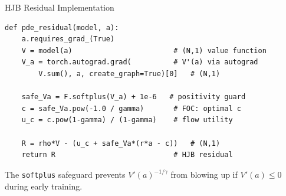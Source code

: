 \documentclass[aspectratio=169,11pt]{beamer}
\begin{document}
\begin{frame}[fragile]{HJB Residual Implementation}
\begin{lstlisting}[basicstyle=\footnotesize\ttfamily]
def pde_residual(model, a):
    a.requires_grad_(True)
    V = model(a)                        # (N,1) value function
    V_a = torch.autograd.grad(          # V'(a) via autograd
        V.sum(), a, create_graph=True)[0]   # (N,1)

    safe_Va = F.softplus(V_a) + 1e-6   # positivity guard
    c = safe_Va.pow(-1.0 / gamma)       # FOC: optimal c
    u_c = c.pow(1-gamma) / (1-gamma)    # flow utility

    R = rho*V - (u_c + safe_Va*(r*a - c))   # (N,1)
    return R                            # HJB residual
\end{lstlisting}

\vspace{0.1em}
{\footnotesize The \texttt{softplus} safeguard prevents $V'(a)^{-1/\gamma}$ from blowing up if $V'(a) \leq 0$ during early training.}
\end{frame}
\end{document}

